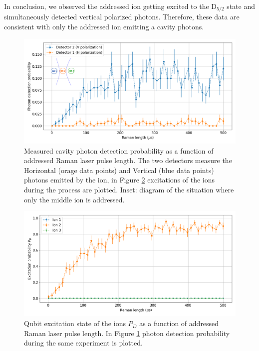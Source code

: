 In conclusion, we observed the addressed ion getting excited to the $\text{D}_{5/2}$ state and simultaneously detected vertical polarized photons. Therefore, these data are consistent with only the addressed ion emitting a cavity photons.
\begin{figure}[H]
\centering
\includegraphics[width=\textwidth]{img/photonefficency_witherror3}
\caption{Measured cavity photon detection probability as a function of addressed Raman laser pulse length. The two detectors measure the Horizontal (orage data points) and Vertical (blue data points) photons emitted by the ion, in Figure \ref{probion} excitations of the ions during the process are plotted. Inset: diagram of the situation where only the middle ion is addressed.}
\label{probphoton}
\end{figure}
\begin{figure}[H]
\centering
\includegraphics[width=\textwidth]{img/ramanlength_witherrors2}
\caption{Qubit excitation state of the ions $P_D$ as a function of addressed Raman laser pulse length. In Figure \ref{probphoton} photon detection probability during the same experiment is plotted.}
\label{probion}
\end{figure}
